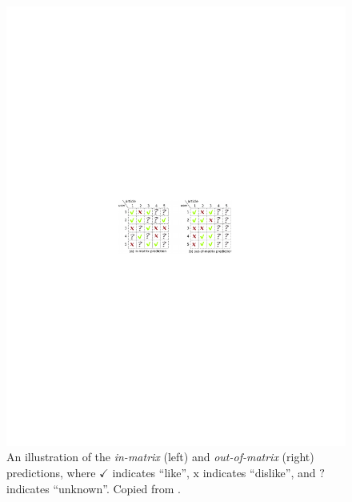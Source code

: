 \begin{figure}
  \centering
    \includegraphics[width=\textwidth]{fig/in_and_out_matrix}
      \caption{An illustration of the \emph{in-matrix} (left) and \emph{out-of-matrix} (right) predictions, where $\checkmark$ indicates ``like'', $\mathrm{x}$ indicates ``dislike'', and $?$ indicates ``unknown''. Copied from \citet{wang2011collaborative}.}
      \label{chpt:content:fig:in_and_out}
\end{figure}

